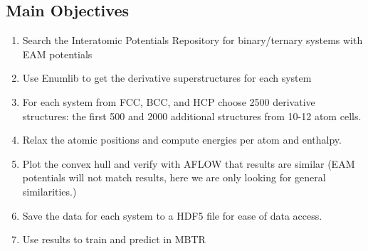 \documentclass[a0,portrait]{a0poster}
\begin{document}
\begin{multicols}{2}
\color{DarkSlateGray} %

\section*{Main Objectives}

\begin{enumerate}
\color{Green} %
\item Search the Interatomic Potentials Repository for binary/ternary systems with EAM potentials
\item Use Enumlib to get the derivative superstructures for each system
\item For each system from FCC, BCC, and HCP choose 2500 derivative structures: the first 500 and 2000 additional structures from 10-12 atom cells.  

\color{DarkSlateGray} %

\item Relax the atomic positions and compute energies per atom and enthalpy.
\item Plot the convex hull and verify with AFLOW that results are similar (EAM potentials will not match results, here we are only looking for general similarities.)
\item Save the data for each system to a HDF5 file for ease of data access.
\item Use results to train and predict in MBTR 
\end{enumerate}








\end{multicols}
\end{document}
